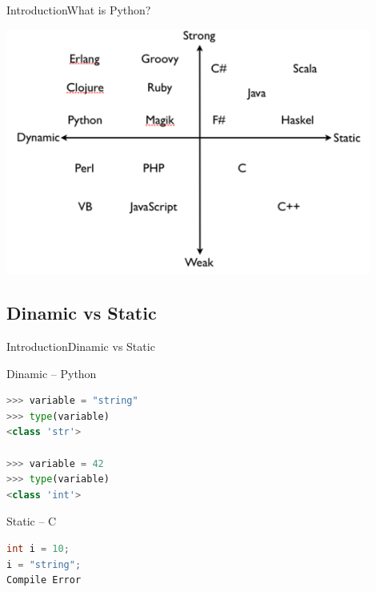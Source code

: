 \documentclass[10pt]{beamer}
\begin{document}
\begin{frame}{Introduction}{What is Python?}
	\begin{center}
		\includegraphics[width=0.9\textwidth]{pictures/1.png}
	\end{center}
\end{frame}



\subsection{Dinamic vs Static}

\begin{frame}[fragile]{Introduction}{Dinamic vs Static}
\begin{center}
\begin{block}{Dinamic -- Python}
			
\begin{lstlisting}[language=Python]
>>> variable = "string"
>>> type(variable)
<class 'str'>

>>> variable = 42
>>> type(variable)
<class 'int'>

\end{lstlisting}
\end{block}
		
\pause
		
\begin{block}{Static -- C}
			
\begin{lstlisting}[language=C]
int i = 10;
i = "string";
Compile Error
\end{lstlisting}

\end{block}

\end{center}
\end{frame}
\end{document}
